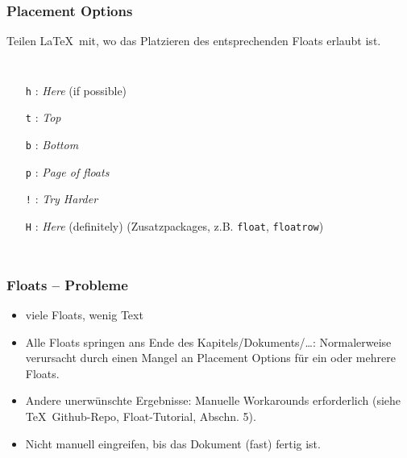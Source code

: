 \documentclass{beamer}                %
\newcommand*\code[1]{\texttt{#1}}
\begin{document}
\begin{frame}[fragile] %
    \frametitle{Placement Options}

    Teilen \LaTeX\ mit, wo das Platzieren des entsprechenden Floats erlaubt ist.

    \begin{columns}
        \begin{itemize}
            \item[\code{h}]: \emph{Here} (if possible)
            \item[\code{t}]: \emph{Top}
            \item[\code{b}]: \emph{Bottom}
            \item[\code{p}]: \emph{Page of floats}
            \item[\code{!}]: \emph{Try Harder}
            \item[\code{H}]: \emph{Here} (definitely)
                (Zusatzpackages, z.B. \code{float}, \code{floatrow})
        \end{itemize}



    \end{columns}
\end{frame}
\begin{frame} %
    \frametitle{Floats -- Probleme}

    \begin{itemize}
        \item
            viele Floats, wenig Text
        \item
            Alle        Floats       springen        ans       Ende        des
            Kapitels/Dokuments/\ldots: Normalerweise  verursacht  durch  einen
            Mangel an Placement Options f\"ur ein oder mehrere Floats.
        \item
            Andere     unerw\"unschte     Ergebnisse: Manuelle     Workarounds
            erforderlich (siehe \TeX\ Github-Repo, Float-Tutorial, Abschn. 5).
        \item
            Nicht manuell eingreifen, bis das Dokument (fast) fertig ist.
    \end{itemize}
\end{frame}
\end{document}
